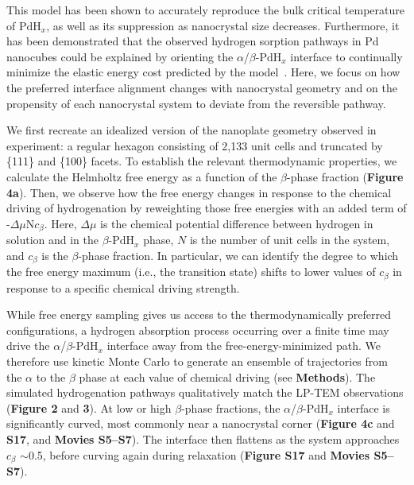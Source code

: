 \documentclass[reprint,amsmath,amssymb,aip,nofootinbib, citeautoscript,]{revtex4-2}
\begin{document}
This model has been shown to accurately reproduce the bulk critical temperature of $\mathrm{PdH}_x$, as well as its suppression as nanocrystal size decreases. Furthermore, it has been demonstrated that the observed hydrogen sorption pathways in Pd nanocubes could be explained by orienting the $\alpha$/$\beta$-$\mathrm{PdH}_x$ interface to continually minimize the elastic energy cost predicted by the model~\cite{lee_atomic_2024}. Here, we focus on how the preferred interface alignment changes with nanocrystal geometry and on the propensity of each nanocrystal system to deviate from the reversible pathway.


We first recreate an idealized version of the nanoplate geometry observed in experiment: a regular hexagon consisting of 2,133 unit cells and truncated by \{111\} and \{100\} facets. To establish the relevant thermodynamic properties, we calculate the Helmholtz free energy as a function of the $\beta$-phase fraction (\textbf{Figure 4a}). Then, we observe how the free energy changes in response to the chemical driving of hydrogenation by reweighting those free energies with an added term of -$\Delta$$\mu$N$c_\beta$. Here, $\Delta$$\mu$ is the chemical potential difference between hydrogen in solution and in the $\beta$-$\mathrm{PdH}_x$ phase, $N$ is the number of unit cells in the system, and $c_\beta$ is the $\beta$-phase fraction. In particular, we can identify the degree to which the free energy maximum (i.e., the transition state) shifts to lower values of $c_\beta$ in response to a specific chemical driving strength.


While free energy sampling gives us access to the thermodynamically preferred configurations, a hydrogen absorption process occurring over a finite time may drive the $\alpha$/$\beta$-$\mathrm{PdH}_x$ interface away from the free-energy-minimized path. We therefore use kinetic Monte Carlo to generate an ensemble of trajectories from the $\alpha$ to the $\beta$ phase at each value of chemical driving (see \textbf{Methods}). The simulated hydrogenation pathways qualitatively match the LP-TEM observations (\textbf{Figure 2} and \textbf{3}). At low or high $\beta$-phase fractions, the $\alpha$/$\beta$-$\mathrm{PdH}_x$ interface is significantly curved, most commonly near a nanocrystal corner (\textbf{Figure 4c} and \textbf{S17}, and \textbf{Movies S5–S7}). The interface then flattens as the system approaches $c_\beta$ $\sim$0.5, before curving again during relaxation (\textbf{Figure S17} and \textbf{Movies S5–S7}).
\end{document}
